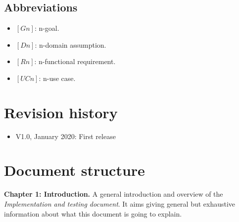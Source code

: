 \documentclass[../ITD.tex]{subfiles}
\begin{document}
    \subsection{Abbreviations}\label{subsec:abbreviations}
    \begin{itemize}
        \item $[Gn]$: n-goal.
        \item $[Dn]$: n-domain assumption.
        \item $[Rn]$: n-functional requirement.
        \item $[UCn]$: n-use case.
    \end{itemize}
    \newpage
    \section{Revision history}\label{sec:revision-history}
    \begin{itemize}
        \item V1.0, January  2020: First release
    \end{itemize}
    \section{Document structure}\label{sec:document-structure}
    \textbf{Chapter 1: Introduction.}
    A general introduction and overview of the \textit{Implementation and testing document}.
    It aims giving general but exhaustive information about what this document is going to explain.
\end{document}
